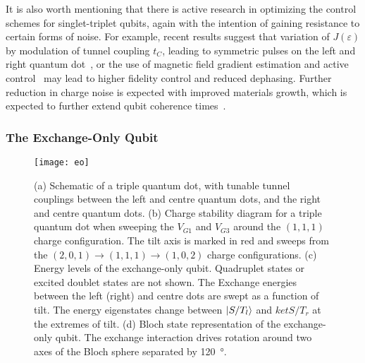 It is also worth mentioning that there is active research in optimizing the control schemes for singlet-triplet qubits, again with
the intention of gaining resistance to certain forms of noise. For example, recent results suggest that variation of $J(\varepsilon)$ by modulation of
tunnel coupling $t_C$, leading to symmetric pulses on the left and right quantum dot~\cite{PhysRevB.73.205302,PhysRevB.97.155402,PhysRevLett.116.116801,PhysRevLett.118.216802},
or the use of magnetic field gradient estimation and active control~\cite{ncomms6156,s41534-016-0003-1} may lead to higher
fidelity control and reduced dephasing. Further reduction in charge noise is expected with
improved materials growth, which is expected to further extend qubit coherence times~\cite{PhysRevApplied.9.034008}.

\subsubsection{The Exchange-Only Qubit}

\begin{figure}
  \texttt{[image: eo]}
  \caption[Energy levels and eigenstates of an Exchange-Only qubit]
  {\label{fig:eo}(a) Schematic of a triple quantum dot, with tunable tunnel couplings between the left and centre quantum dots, and the
  right and centre quantum dots. (b) Charge stability diagram for a triple quantum dot when sweeping the $V_{G1}$ and $V_{G3}$ around the
  $(1,1,1)$ charge configuration. The tilt axis is marked in red and sweeps from the $(2,0,1) \rightarrow (1,1,1) \rightarrow (1,0,2)$
  charge configurations. (c) Energy levels of the exchange-only qubit. Quadruplet states or excited doublet states are not shown. The Exchange energies
  between the left (right) and centre dots are swept as a function of tilt. The energy eigenstates change between $\ket{S/T_l}$ and $ket{S/T_r}$
  at the extremes of tilt. (d) Bloch state representation of the exchange-only qubit. The exchange interaction drives rotation around two
  axes of the Bloch sphere separated by \SI{120}{\degree}.}
\end{figure}

